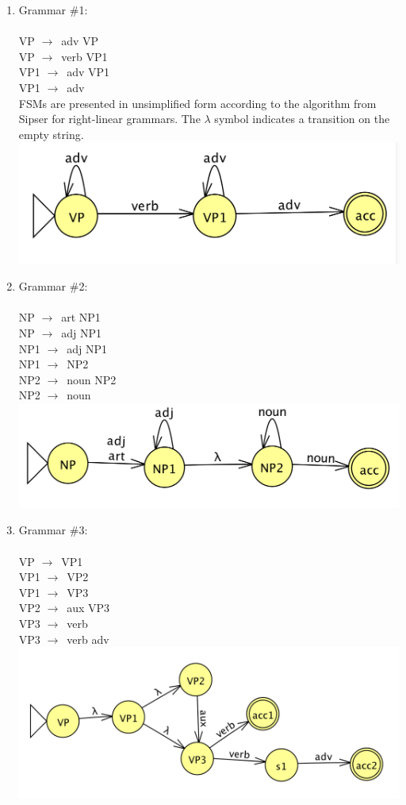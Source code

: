 \documentclass[11pt]{article}
\newcommand{\ra}{$\rightarrow$~}
\begin{document}
\begin{enumerate}
\begin{enumerate}
\item Grammar \#1: \\ ~ \\
VP \ra adv VP \\
VP \ra verb VP1 \\
VP1 \ra adv VP1 \\
VP1 \ra adv \\
FSMs are presented in unsimplified form according to the algorithm from Sipser for right-linear grammars. The $\lambda$ symbol indicates a transition on the empty string.\\
\includegraphics[width=.8\textwidth]{Grammar1.png}
\item Grammar \#2: \\ ~ \\
NP \ra art NP1 \\
NP \ra adj NP1 \\
NP1 \ra adj NP1 \\
NP1 \ra NP2 \\
NP2 \ra noun NP2 \\
NP2 \ra noun \\
\includegraphics[width=.8\textwidth]{Grammar2.png}\newpage
\item Grammar \#3: \\ ~ \\
VP \ra VP1 \\
VP1 \ra VP2 \\
VP1 \ra VP3 \\
VP2 \ra aux VP3 \\
VP3 \ra verb \\
VP3 \ra verb adv\\
\includegraphics[width=.8\textwidth]{Grammar3.png}
\end{enumerate}



\end{enumerate}
\end{document}
